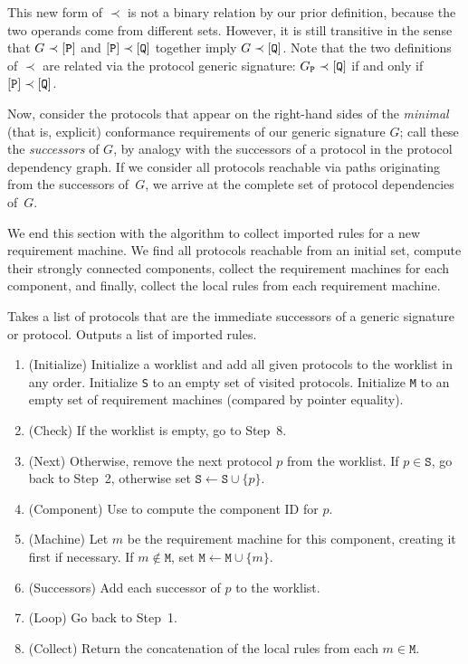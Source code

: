 \documentclass[../generics]{subfiles}
\begin{document}
This new form of $\prec$ is not a binary relation by our prior definition, because the two operands come from different sets. However, it is still transitive in the sense that $G\prec[\texttt{P}]$ and $[\texttt{P}]\prec[\texttt{Q}]$ together imply $G\prec[\texttt{Q}]$. Note that the two definitions of $\prec$ are related via the protocol generic signature: $G_{\texttt{P}}\prec[\texttt{Q}]$ if and only if $[\texttt{P}]\prec[\texttt{Q}]$.

Now, consider the protocols that appear on the right-hand sides of the \emph{minimal} (that is, explicit) conformance requirements of our generic signature $G$; call these the \emph{successors} of $G$, by analogy with the successors of a protocol in the protocol dependency graph. If we consider all protocols reachable via paths originating from the successors of~$G$, we arrive at the complete set of protocol dependencies of~$G$.

We end this section with the algorithm to collect imported rules for a new requirement machine. We find all protocols reachable from an initial set, compute their strongly connected components, collect the requirement machines for each component, and finally, collect the local rules from each requirement machine.
\begin{algorithm}\label{importing rules}
Takes a list of protocols that are the immediate successors of a generic signature or protocol. Outputs a list of imported rules.
\begin{enumerate}
\item (Initialize) Initialize a worklist and add all given protocols to the worklist in any order. Initialize \texttt{S} to an empty set of visited protocols. Initialize \texttt{M} to an empty set of requirement machines (compared by pointer equality).
\item (Check) If the worklist is empty, go to Step~8.
\item (Next) Otherwise, remove the next protocol $p$ from the worklist. If $p\in\texttt{S}$, go back to Step~2, otherwise set $\texttt{S}\leftarrow\texttt{S}\cup\{p\}$.
\item (Component) Use  to compute the component ID for $p$.
\item (Machine) Let $m$ be the requirement machine for this component, creating it first if necessary. If $m\notin\texttt{M}$, set $\texttt{M}\leftarrow\texttt{M}\cup\{m\}$.
\item (Successors) Add each successor of $p$ to the worklist.
\item (Loop) Go back to Step~1.
\item (Collect) Return the concatenation of the local rules from each $m\in\texttt{M}$.
\end{enumerate}
\end{algorithm}
\end{document}
